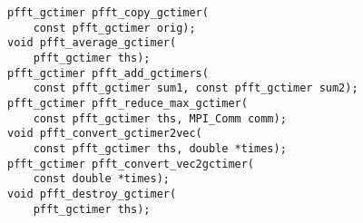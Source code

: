 \begin{lstlisting}
pfft_gctimer pfft_copy_gctimer(
    const pfft_gctimer orig);
void pfft_average_gctimer(
    pfft_gctimer ths);
pfft_gctimer pfft_add_gctimers(
    const pfft_gctimer sum1, const pfft_gctimer sum2);
pfft_gctimer pfft_reduce_max_gctimer(
    const pfft_gctimer ths, MPI_Comm comm);
void pfft_convert_gctimer2vec(
    const pfft_gctimer ths, double *times);
pfft_gctimer pfft_convert_vec2gctimer(
    const double *times);
void pfft_destroy_gctimer(
    pfft_gctimer ths);
\end{lstlisting}

